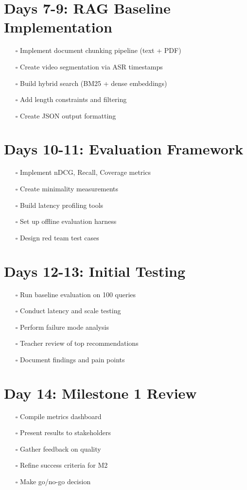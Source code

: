 \documentclass[11pt,a4paper]{report}
\begin{document}
\section{Days 7-9: RAG Baseline Implementation}
\begin{itemize}
    \item[$\square$] Implement document chunking pipeline (text + PDF)
    \item[$\square$] Create video segmentation via ASR timestamps
    \item[$\square$] Build hybrid search (BM25 + dense embeddings)
    \item[$\square$] Add length constraints and filtering
    \item[$\square$] Create JSON output formatting
\end{itemize}

\section{Days 10-11: Evaluation Framework}
\begin{itemize}
    \item[$\square$] Implement nDCG, Recall, Coverage metrics
    \item[$\square$] Create minimality measurements
    \item[$\square$] Build latency profiling tools
    \item[$\square$] Set up offline evaluation harness
    \item[$\square$] Design red team test cases
\end{itemize}

\section{Days 12-13: Initial Testing}
\begin{itemize}
    \item[$\square$] Run baseline evaluation on 100 queries
    \item[$\square$] Conduct latency and scale testing
    \item[$\square$] Perform failure mode analysis
    \item[$\square$] Teacher review of top recommendations
    \item[$\square$] Document findings and pain points
\end{itemize}

\section{Day 14: Milestone 1 Review}
\begin{itemize}
    \item[$\square$] Compile metrics dashboard
    \item[$\square$] Present results to stakeholders
    \item[$\square$] Gather feedback on quality
    \item[$\square$] Refine success criteria for M2
    \item[$\square$] Make go/no-go decision
\end{itemize}
\end{document}
